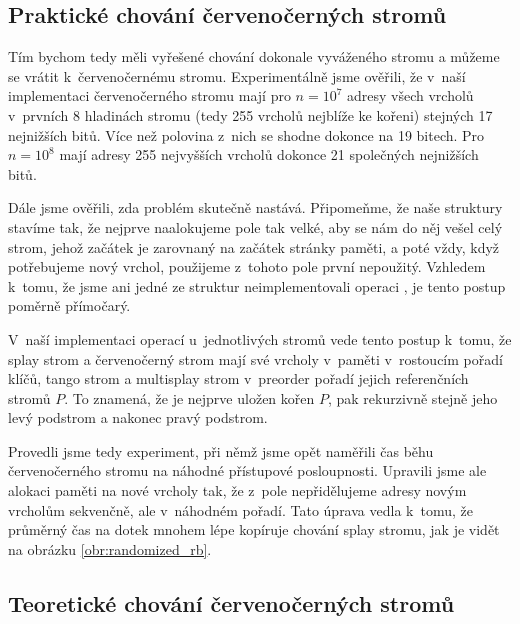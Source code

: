 \subsection{Praktické chování červenočerných stromů}

Tím bychom tedy měli vyřešené chování dokonale vyváženého stromu a můžeme se
vrátit k~červenočernému stromu. Experimentálně jsme ověřili, že v~naší
implementaci červenočerného stromu mají pro $n= 10^7$ adresy všech vrcholů
v~prvních 8 hladinách stromu (tedy 255 vrcholů nejblíže ke kořeni)
stejných 17 nejnižších bitů. Více než polovina z~nich se shodne dokonce na 19
bitech. Pro $n=10^8$ mají adresy 255 nejvyšších vrcholů dokonce 21
společných nejnižších bitů.   

Dále jsme ověřili, zda problém skutečně nastává. Připomeňme, že naše struktury stavíme tak, že nejprve naalokujeme pole tak velké, aby se nám do něj vešel celý strom, jehož začátek je zarovnaný na začátek stránky paměti, a poté vždy, když potřebujeme nový vrchol, použijeme z~tohoto pole první nepoužitý. Vzhledem k~tomu, že jsme ani jedné ze struktur neimplementovali operaci , je tento postup poměrně přímočarý.

V~naší implementaci operací  u~jednotlivých stromů vede tento postup k~tomu, že splay strom a červenočerný strom mají své vrcholy v~paměti v~rostoucím pořadí klíčů, tango strom a multisplay strom v~preorder pořadí jejich referenčních stromů $P$. To znamená, že je nejprve uložen kořen $P$, pak rekurzivně stejně jeho levý podstrom a nakonec pravý podstrom.

Provedli jsme tedy experiment, při němž jsme opět naměřili čas běhu červenočerného stromu na náhodné přístupové posloupnosti. Upravili jsme ale alokaci paměti na nové vrcholy tak, že z~pole nepřidělujeme adresy novým vrcholům sekvenčně, ale v~náhodném pořadí. Tato úprava vedla k~tomu, že průměrný čas na dotek mnohem lépe kopíruje chování splay stromu, jak je vidět na obrázku \ref{obr:randomized_rb}.


\subsection{Teoretické chování červenočerných stromů}\label{sec:tree_theory}

